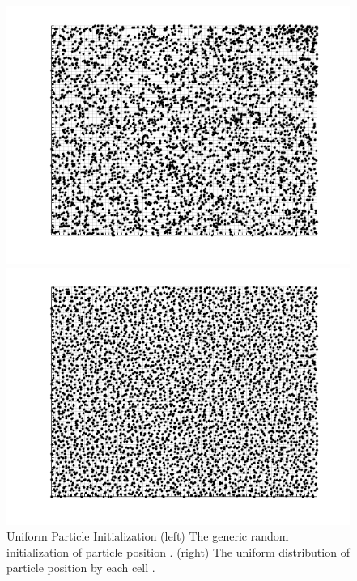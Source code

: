 \begin{figure}
    \centering
  \begin{minipage}[b]{0.49\textwidth}
    \includegraphics[width=\textwidth]{figures/psudo_init.png}
  \end{minipage} %
  \begin{minipage}[b]{0.49\textwidth}
    \includegraphics[width=\textwidth]{figures/uniform_init.png}

  \end{minipage}
  \caption[Uniform Particle Initialization]{Uniform Particle Initialization (left) The generic random initialization of particle position \cite{mac_thesis}. (right) The uniform distribution of particle position by each cell \cite{mac_thesis}.}
  \label{fig:part_init}
\end{figure}

